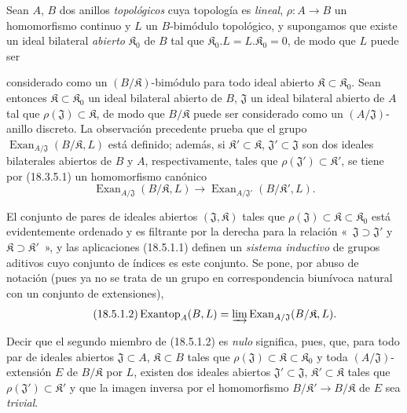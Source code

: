 \begin{env}[18.5.1]
\label{0.18.5.1-fr}
Sean $A$, $B$ dos anillos \emph{topológicos} cuya topología es \emph{lineal},
$\rho:A\to B$ un homomorfismo continuo y $L$ un $B$-bimódulo topológico, y
supongamos que existe un ideal bilateral \emph{abierto} $\mathfrak K_0$ de $B$
tal que $\mathfrak K_0.L=L.\mathfrak K_0=0$, de modo que $L$ puede ser


considerado como un $(B/\mathfrak K)$-bimódulo para todo ideal abierto
$\mathfrak K\subset\mathfrak K_0$. Sean entonces
$\mathfrak K\subset\mathfrak K_0$ un ideal bilateral abierto de $B$,
$\mathfrak J$ un ideal bilateral abierto de $A$ tal que
$\rho(\mathfrak J)\subset\mathfrak K$, de modo que $B/\mathfrak K$ puede ser
considerado como un $(A/\mathfrak J)$-anillo discreto. La observación
precedente prueba que el grupo
$\operatorname{Exan}_{A/\mathfrak J}(B/\mathfrak K,L)$ está definido; además,
si $\mathfrak K'\subset\mathfrak K$, $\mathfrak J'\subset\mathfrak J$ son dos
ideales bilaterales abiertos de $B$ y $A$, respectivamente, tales que
$\rho(\mathfrak J')\subset\mathfrak K'$, se tiene por (18.3.5.1) un
homomorfismo canónico
\begin{equation}
\label{0.18.5.1.1-fr}
\tag{18.5.1.1}
  \operatorname{Exan}_{A/\mathfrak J}(B/\mathfrak K,L)
  \longrightarrow
  \operatorname{Exan}_{A/\mathfrak J'}(B/\mathfrak K',L).
\end{equation}

El conjunto de pares de ideales abiertos $(\mathfrak J,\mathfrak K)$ tales que
$\rho(\mathfrak J)\subset\mathfrak K\subset\mathfrak K_0$ está evidentemente
ordenado y es filtrante por la derecha para la relación «~$\mathfrak J\supset\mathfrak J'$
y $\mathfrak K\supset\mathfrak K'$~», y las aplicaciones (18.5.1.1)
definen un \emph{sistema inductivo} de grupos aditivos cuyo conjunto
de índices es este conjunto. Se pone, por abuso de notación (pues ya no se trata
de un grupo en correspondencia biunívoca natural con un conjunto
de extensiones),
\begin{equation}
\label{0.18.5.1.2-fr}
\tag{18.5.1.2}
  \operatorname{Exantop}_A(B,L)
  =\varinjlim\operatorname{Exan}_{A/\mathfrak J}(B/\mathfrak K,L).
\end{equation}

Decir que el segundo miembro de (18.5.1.2) es \emph{nulo} significa, pues, que, para
todo par de ideales abiertos $\mathfrak J\subset A$, $\mathfrak K\subset B$
tales que $\rho(\mathfrak J)\subset\mathfrak K\subset\mathfrak K_0$ y toda
$(A/\mathfrak J)$-extensión $E$ de $B/\mathfrak K$ por $L$, existen dos
ideales abiertos $\mathfrak J'\subset\mathfrak J$,
$\mathfrak K'\subset\mathfrak K$ tales que
$\rho(\mathfrak J')\subset\mathfrak K'$ y que la imagen inversa por
el homomorfismo $B/\mathfrak K'\to B/\mathfrak K$ de $E$ sea \emph{trivial}.


\end{env}

